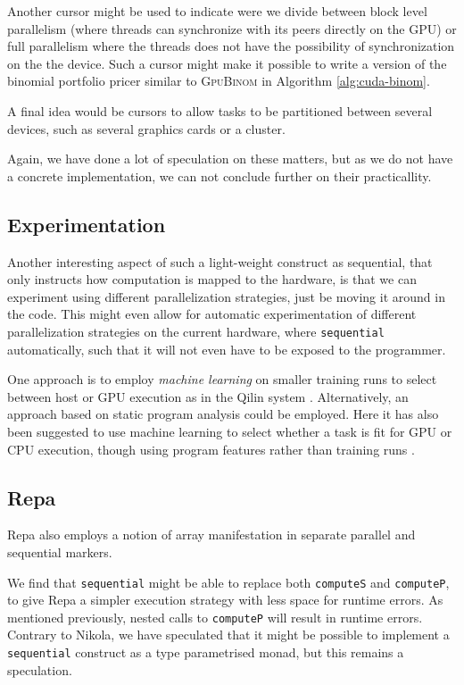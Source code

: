 Another cursor might be used to indicate were we divide between block
level parallelism (where threads can synchronize with its peers
directly on the GPU) or full parallelism where the threads does not
have the possibility of synchronization on the the device. Such a
cursor might make it possible to write a version of the binomial
portfolio pricer similar to \textsc{GpuBinom} in Algorithm
\ref{alg:cuda-binom}.

A final idea would be cursors to allow tasks to be partitioned between
several devices, such as several graphics cards or a cluster.

Again, we have done a lot of speculation on these matters, but as we
do not have a concrete implementation, we can not conclude further on
their practicallity.



\subsection{Experimentation}
Another interesting aspect of such a light-weight construct as
sequential, that only instructs how computation is mapped to the
hardware, is that we can experiment using different parallelization
strategies, just be moving it around in the code. This might even
allow for automatic experimentation of different parallelization
strategies on the current hardware, where \lstinline{sequential} automatically, such that it will not
even have to be exposed to the programmer.

One approach is to employ \emph{machine learning} on smaller training
runs to select between host or GPU execution as in the Qilin system
\cite{luk2009qilin}. Alternatively, an approach based on static
program analysis could be employed. Here it has also been suggested to
use machine learning to select whether a task is fit for GPU or CPU
execution, though using program features rather than training runs
\cite{grewe2011static}.

\subsection{Repa}
Repa also employs a notion of array manifestation in separate parallel and
sequential markers.

We find that \lstinline{sequential} might be able to replace both
\lstinline{computeS} and \lstinline{computeP}, to give Repa a simpler
execution strategy with less space for runtime errors. As mentioned
previously, nested calls to \lstinline{computeP} will result in
runtime errors. Contrary to Nikola, we have speculated that it might
be possible to implement a \lstinline{sequential} construct as a type
parametrised monad, but this remains a speculation.

